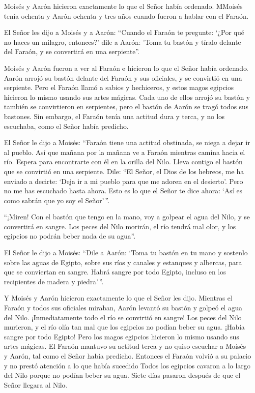  Moisés y Aarón hicieron exactamente lo que el Señor había
ordenado.  MMoisés tenía ochenta y Aarón ochenta y tres años
cuando fueron a hablar con el Faraón.

 El Señor les dijo a Moisés y a Aarón:  ``Cuando
el Faraón te pregunte: `¿Por qué no haces un milagro, entonces?' dile a
Aarón: 'Toma tu bastón y tíralo delante del Faraón, y se convertirá en
una serpiente''.

 Moisés y Aarón fueron a ver al Faraón e hicieron lo que el
Señor había ordenado. Aarón arrojó su bastón delante del Faraón y sus
oficiales, y se convirtió en una serpiente.  Pero el Faraón
llamó a sabios y hechiceros, y estos magos egipcios hicieron lo mismo
usando sus artes mágicas.  Cada uno de ellos arrojó su
bastón y también se convirtieron en serpientes, pero el bastón de Aarón
se tragó todos sus bastones.  Sin embargo, el Faraón tenía
una actitud dura y terca, y no los escuchaba, como el Señor había
predicho.

 El Señor le dijo a Moisés: ``Faraón tiene una actitud
obstinada, se niega a dejar ir al pueblo.  Así que mañana
por la mañana ve a Faraón mientras camina hacia el río. Espera para
encontrarte con él en la orilla del Nilo. Lleva contigo el bastón que se
convirtió en una serpiente.  Dile: ``El Señor, el Dios de
los hebreos, me ha enviado a decirte: `Deja ir a mi pueblo para que me
adoren en el desierto'. Pero no me has escuchado hasta ahora.
 Esto es lo que el Señor te dice ahora: `Así es como sabrán
que yo soy el Señor'\,''.

``¡Miren! Con el bastón que tengo en la mano, voy a golpear el agua del
Nilo, y se convertirá en sangre.  Los peces del Nilo
morirán, el río tendrá mal olor, y los egipcios no podrán beber nada de
su agua''.

 El Señor le dijo a Moisés: ``Dile a Aarón: `Toma tu bastón
en tu mano y sostenlo sobre las aguas de Egipto, sobre sus ríos y
canales y estanques y albercas, para que se conviertan en sangre. Habrá
sangre por todo Egipto, incluso en los recipientes de madera y
piedra'\,''.

 Y Moisés y Aarón hicieron exactamente lo que el Señor les
dijo. Mientras el Faraón y todos sus oficiales miraban, Aarón levantó su
bastón y golpeó el agua del Nilo. ¡Inmediatamente todo el río se
convirtió en sangre!  Los peces del Nilo murieron, y el río
olía tan mal que los egipcios no podían beber su agua. ¡Había sangre por
todo Egipto!  Pero los magos egipcios hicieron lo mismo
usando sus artes mágicas. El Faraón mantuvo su actitud terca y no quiso
escuchar a Moisés y Aarón, tal como el Señor había predicho.
 Entonces el Faraón volvió a su palacio y no prestó
atención a lo que había sucedido  Todos los egipcios
cavaron a lo largo del Nilo porque no podían beber su agua.
 Siete días pasaron después de que el Señor llegara al
Nilo.

